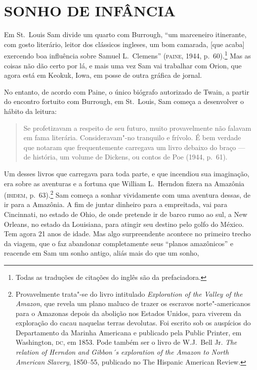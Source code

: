 \section{SONHO DE INFÂNCIA} 

Em St.~Louis Sam divide um quarto com Burrough,
``um marceneiro itinerante, com gosto literário, leitor dos clássicos ingleses,
um bom camarada, [que acaba] exercendo boa influência sobre Samuel L.~Clemens''
(\textsc{paine}, 1944, p.~60).\footnote{ Todas as traduções
de citações do inglês são da prefaciadora.} Mas as coisas não dão certo por lá, e mais uma vez Sam vai
trabalhar com Orion, que agora está em Keokuk, Iowa, em posse de outra
gráfica de jornal.

No entanto, de acordo com Paine, o único biógrafo autorizado de Twain, a
partir do encontro fortuito com Burrough, em St.~Louis, Sam começa a
desenvolver o hábito da leitura:

\begin{quote}
Se profetizavam a respeito
de seu futuro, muito provavelmente não falavam em fama literária.
Consideravam"-no tranquilo e frívolo. É bem verdade que notaram que
frequentemente carregava um livro debaixo do braço --- de história, um
volume de Dickens, ou contos de Poe (1944, p.~61).
\end{quote}

Um desses livros que carregava para toda parte, e que incendiou sua
imaginação, era sobre as aventuras e a fortuna que William L.~Herndon
fizera na Amazônia (\textsc{ibidem}, p.~63).\footnote{ Provavelmente trata"-se do
livro intitulado \textit{Exploration of the Valley of the
Amazon}, que revela um plano maluco de trazer os escravos
norte"-americanos para o Amazonas depois da abolição nos
Estados Unidos, para viverem da exploração do cacau naquelas terras
devolutas. Foi escrito sob os auspícios do Departamento da Marinha
Americana e publicado pela Public Printer, em Washington, \textsc{dc}, em 1853.
Pode também ser o livro de W.J.~Bell Jr. \textit{The relation of Herndon
and Gibbon´s exploration of the Amazon to North American Slavery},
1850--55, publicado no The Hispanic American Review.} Sam começa a
sonhar vividamente com uma aventura dessas, de ir para a Amazônia. A fim de
juntar dinheiro para a empreitada, vai para Cincinnati, no estado de
Ohio, de onde pretende ir de barco rumo ao sul, a New Orleans, no estado
da Louisiana, para atingir seu destino pelo golfo do México. Tem agora
21 anos de idade. Mas algo surpreendente acontece no primeiro
trecho da viagem, que o faz abandonar completamente seus
``planos amazônicos'' e reacende em Sam um sonho
antigo, aliás mais do que um sonho,

